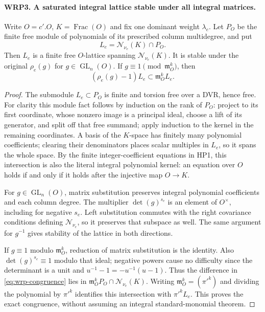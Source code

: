 \paragraph{WRP3. A saturated integral lattice stable under all integral matrices.}
\label{claim:WRP3}
Write $O=c'.O$, $K=\operatorname{Frac}(O)$ and fix one dominant
weight $\lambda_e$.  Let $P_O$ be the finite free module of
polynomials of its prescribed column multidegree, and put
\[
              L_e=\mathcal N_{\nu_e}(K)\cap P_O.
\]
Then $L_e$ is a finite free $O$-lattice spanning
$\mathcal N_{\nu_e}(K)$.  It is stable under the original
$\rho_e(g)$ for $g\in\operatorname{GL}_n(O)$.  If
$g\equiv1\pmod{\mathfrak m_O^k}$, then
\begin{equation}\label{eq:wrp-congruence}
             (\rho_e(g)-1)L_e\subset\mathfrak m_O^k L_e.
\end{equation}
\begin{proof}
The submodule $L_e\subset P_O$ is finite and torsion free
over a DVR, hence free.  For clarity this module fact follows
by induction on the rank of $P_O$: project to its first
coordinate, whose nonzero image is a principal ideal,
choose a lift of its generator, and split off that free
summand; apply induction to the kernel in the remaining
coordinates.  A basis of the $K$-space has finitely many
polynomial coefficients; clearing their denominators places
scalar multiples in $L_e$, so it spans the whole space.
By the finite integer-coefficient equations in HP1, this
intersection is also the literal integral polynomial kernel:
an equation over $O$ holds if and only if it holds after
the injective map $O\to K$.

For $g\in\operatorname{GL}_n(O)$, matrix substitution
preserves integral polynomial coefficients and each column
degree.  The multiplier $\det(g)^{s_e}$ is an element of
$O^\times$, including for negative $s_e$.  Left substitution
commutes with the right covariance conditions defining
$\mathcal N_{\nu_e}$, so it preserves that subspace as well.
The same argument for $g^{-1}$ gives stability of the lattice
in both directions.

If $g\equiv1$ modulo $\mathfrak m_O^k$, reduction of matrix
substitution is the identity.  Also
$\det(g)^{s_e}\equiv1$ modulo that ideal; negative powers
cause no difficulty since the determinant is a unit and
$u^{-1}-1=-u^{-1}(u-1)$.  Thus the difference in
\eqref{eq:wrp-congruence} lies in
$\mathfrak m_O^kP_O\cap\mathcal N_{\nu_e}(K)$.
Writing $\mathfrak m_O^k=(\pi'^k)$ and dividing the
polynomial by $\pi'^k$ identifies this intersection with
$\pi'^kL_e$.  This proves the exact congruence, without
assuming an integral standard-monomial theorem.
\end{proof}

